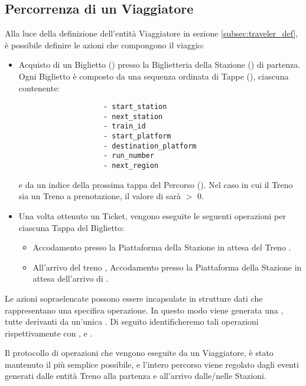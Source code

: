 \subsection{Percorrenza di un Viaggiatore}\label{subsec:percorrenza_viaggiatore}
	
	Alla luce della definizione dell'entità Viaggiatore in sezione \ref{subsec:traveler_def}, è possibile definire le azioni che compongono il viaggio:
		\begin{itemize}
			\item Acquisto di un Biglietto () presso la Biglietteria della Stazione () di partenza. Ogni Biglietto è composto da una sequenza ordinata di Tappe (), ciascuna contenente:
				\begin{verbatim}
					- start_station
					- next_station
					- train_id 
					- start_platform 
					- destination_platform
					- run_number
					- next_region
				\end{verbatim}
			e da un indice della prossima tappa del Percorso (). Nel caso in cui il Treno  sia un Treno a prenotazione, il valore di  sarà $>$ 0.
			
			\item Una volta ottenuto un Ticket, vengono eseguite le seguenti operazioni per ciascuna Tappa del Biglietto:
				\begin{itemize}
					\item Accodamento presso la Piattaforma  della Stazione  in attesa del Treno .
					\item All'arrivo del treno , Accodamento presso la Piattaforma  della Stazione  in attesa dell'arrivo di . 
				\end{itemize}
		\end{itemize} 
	Le azioni sopraelencate possono essere incapsulate in strutture dati che rappresentano una specifica operazione. In questo modo viene generata una , tutte derivanti da un'unica . Di seguito identificheremo tali operazioni rispettivamente con ,  e .
	
	Il protocollo di operazioni che vengono eseguite da un Viaggiatore, è stato mantenuto il più semplice possibile, e l'intero percorso viene regolato dagli eventi generati dalle entità Treno alla partenza e all'arrivo dalle/nelle Stazioni. 
	
